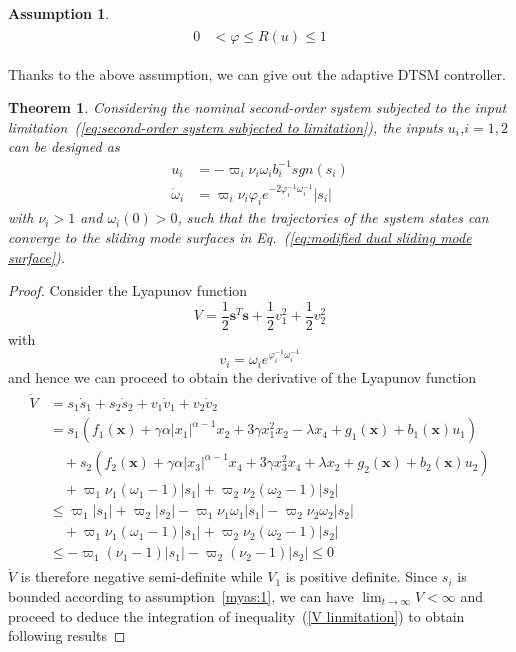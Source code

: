 \documentclass[3p]{elsarticle}
\theoremstyle{plain}
\newtheorem{myas}{Assumption}
\newtheorem{mythm}{Theorem}
\theoremstyle{remark}
\begin{document}
{\begin{myas}
\begin{align}
\begin{split}
  0&<\varphi\le R(u) \le 1
\end{split}\end{align}
\end{myas}
Thanks to the above assumption, we can give out the adaptive DTSM controller.
\begin{mythm}\label{thm:4}
Considering the nominal second-order system subjected to the input limitation~(\ref{eq:second-order system subjected to limitation}), the inputs $u_i$,$i=1,2$ can be designed as
\begin{align}
  u_i &= -\varpi_i\nu_i\omega_i b_i^{-1}sgn(s_i)\\
  \dot\omega_i&= \varpi_i\nu_i\varphi_i e^{-2\varphi_i^{-1}\omega_i^{-1}}\vert s_i\vert
\end{align}
with $\nu_i>1$ and $\omega_i(0)>0$, such that the trajectories of the system states can converge to the sliding mode  surfaces in Eq.~(\ref{eq:modified dual sliding mode  surface}).
\end{mythm}
\begin{proof}
Consider the Lyapunov function
$$V=\frac{1}{2}\bm s^T\bm s+\frac{1}{2}v_1^2+\frac{1}{2}v_2^2$$
with
$$v_i = \omega_ie^{\varphi_i^{-1}\omega_i^{-1}}$$
and hence we can proceed to obtain the derivative of the Lyapunov function
\begin{align}\begin{split}
\dot V &=s_1\dot s_1+s_2\dot s_2+v_1\dot v_1+v_2\dot v_2\\
&=s_1(f_1(\bm x)+\gamma\alpha\vert x_1\vert^{\alpha-1}x_2+3\gamma x_1^2x_2-\lambda x_4+g_1(\bm x)+b_1(\bm x)u_1)\\
&\quad +s_2(f_2(\bm x)+\gamma\alpha\vert x_3\vert^{\alpha-1}x_4+3\gamma x_3^2x_4+\lambda x_2+g_2(\bm x)+b_2(\bm x)u_2)\\
&\quad+\varpi_1\nu_1(\omega_1-1)\vert s_1\vert+\varpi_2\nu_2(\omega_2-1)\vert s_2\vert\\
&\le \varpi_1\vert s_1\vert+\varpi_2\vert s_2\vert-\varpi_1\nu_1\omega_1\vert s_1\vert-\varpi_2\nu_2\omega_2\vert s_2\vert\\
&\quad + \varpi_1\nu_1(\omega_1-1)\vert s_1\vert+\varpi_2\nu_2(\omega_2-1)\vert s_2\vert\\
&\le -\varpi_1(\nu_1-1)\vert s_1\vert-\varpi_2(\nu_2-1)\vert s_2\vert\le 0\label{V linmitation}
\end{split}\end{align}
$\dot V$ is therefore negative semi-definite while $V_1$ is positive definite. Since  $s_i$ is bounded according to assumption~\ref{myas:1}, we can have $\lim_{t\to\infty}V<\infty$ and proceed to deduce the integration of inequality~(\ref{V linmitation}) to obtain following results

\end{proof}}
\end{document}
